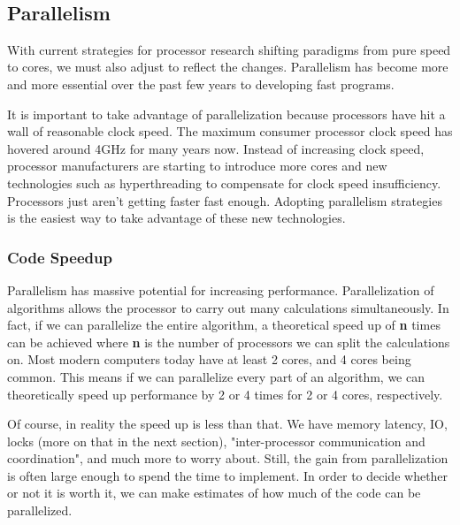 \documentclass[letterpaper, 12pt]{article}
\begin{document}
\
\newpage

\subsection{Parallelism}
With current strategies for processor research shifting paradigms from pure speed to cores, we must also adjust to reflect the changes. Parallelism has become more and more essential over the past few years to developing fast programs.

\par\vspace{\baselineskip}

It is important to take advantage of parallelization because processors have hit a wall of reasonable clock speed\citep{processorspeed}. The maximum consumer processor clock speed has hovered around 4GHz for many years now. Instead of increasing clock speed, processor manufacturers are starting to introduce more cores and new technologies such as hyperthreading to compensate for clock speed insufficiency. Processors just aren't getting faster fast enough. Adopting parallelism strategies is the easiest way to take advantage of these new technologies.

\subsubsection{Code Speedup}
Parallelism has massive potential for increasing performance. Parallelization of algorithms allows the processor to carry out many calculations simultaneously. In fact, if we can parallelize the entire algorithm, a theoretical speed up of {\bfseries n} times can be achieved where {\bfseries n} is the number of processors we can split the calculations on. Most modern computers today have at least 2 cores, and 4 cores being common. This means if we can parallelize every part of an algorithm, we can theoretically speed up performance by 2 or 4 times for 2 or 4 cores, respectively. 

\par\vspace{\baselineskip}
Of course, in reality the speed up is less than that. We have memory latency, IO, locks (more on that in the next section), "inter-processor communication and coordination"\citep[p. 13]{artofmulti}, and much more to worry about. Still, the gain from parallelization is often large enough to spend the time to implement. In order to decide whether or not it is worth it, we can make estimates of how much of the code can be parallelized.
\end{document}
